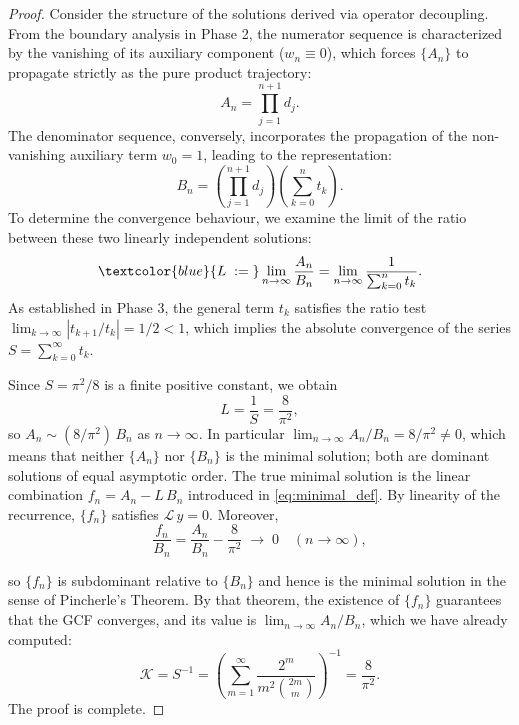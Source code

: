 \documentclass[pdflatex,sn-mathphys-num]{sn-jnl}
\theoremstyle{thmstyleone}
\theoremstyle{thmstyletwo}
\theoremstyle{thmstylethree}
\begin{document}
	\begin{proof}
		Consider the structure of the solutions derived via operator decoupling. From the boundary analysis in Phase 2, the numerator sequence is characterized by the vanishing of its auxiliary component ($w_n \equiv 0$), which forces $\{A_n\}$ to propagate strictly as the pure product trajectory:
		\begin{equation}
			A_n = \prod_{j=1}^{n+1} d_j.
		\end{equation}
		The denominator sequence, conversely, incorporates the propagation of the non-vanishing auxiliary term $w_0 = 1$, leading to the representation:
		\begin{equation}
			B_n = \left( \prod_{j=1}^{n+1} d_j \right) \left( \sum_{k=0}^{n} t_k \right).
		\end{equation}
		To determine the convergence behaviour, we examine the limit of the ratio between these two linearly independent solutions:
		\begin{equation}
			\textcolor{blue}{L \;:=\;} \lim_{n \to \infty} \frac{A_n}{B_n} = \lim_{n \to \infty} \frac{1}{\sum_{k=0}^{n} t_k}.
		\end{equation}
		As established in Phase 3, the general term $t_k$ satisfies the ratio test $\lim_{k \to \infty} |t_{k+1}/t_k| = 1/2 < 1$, which implies the absolute convergence of the series $S = \sum_{k=0}^{\infty} t_k$.
		
		Since $S = \pi^2/8$ is a finite positive constant, we obtain
		\begin{equation}
			L = \frac{1}{S} = \frac{8}{\pi^2},
		\end{equation}
		so $A_n \sim (8/\pi^2)\,B_n$ as $n\to\infty$.  In particular $\lim_{n\to\infty} A_n/B_n = 8/\pi^2 \neq 0$, which means that neither $\{A_n\}$ nor $\{B_n\}$ is the minimal solution; both are dominant solutions of equal asymptotic order.
		The true minimal solution is the linear combination $f_n = A_n - L\,B_n$ introduced in \eqref{eq:minimal_def}.  By linearity of the recurrence, $\{f_n\}$ satisfies $\mathcal{L}\,y=0$.  Moreover,
		\begin{equation}
			\frac{f_n}{B_n} = \frac{A_n}{B_n} - \frac{8}{\pi^2} \;\longrightarrow\; 0 \quad (n \to \infty),
		\end{equation}
		
		so $\{f_n\}$ is subdominant relative to $\{B_n\}$ and hence is the minimal solution in the sense of Pincherle's Theorem.  By that theorem, the existence of $\{f_n\}$ guarantees that the GCF converges, and its value is $\lim_{n\to\infty} A_n/B_n$, which we have already computed:
		\begin{equation}
			\mathcal{K} = S^{-1} = \left( \sum_{m=1}^{\infty} \frac{2^m}{m^2 \binom{2m}{m}} \right)^{-1} = \frac{8}{\pi^2}.
		\end{equation}
		The proof is complete.
	\end{proof}
	
\end{document}
